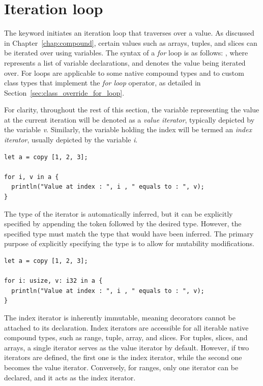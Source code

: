 \section{Iteration loop}%
\label{sec:flow:for_loop}
\label{sec:flow:for_loops}

The keyword  initiates an iteration loop that traverses over a value.
As discussed in Chapter~\ref{chap:compound}, certain values such as arrays,
tuples, and slices can be iterated over using variables. The syntax of a
\textit{for} loop is as follows: , where  represents a list of variable declarations, and  denotes the
value being iterated over. For loops are applicable to some native compound
types and to custom class types that implement the \textit{for loop} operator,
as detailed in Section~\ref{sec:class_override_for_loop}.

For clarity, throughout the rest of this section, the variable representing the
value at the current iteration will be denoted as a \textit{value iterator},
typically depicted by the variable \textit{v}. Similarly, the variable holding
the index will be termed an \textit{index iterator}, usually depicted by the
variable \textit{i}.

\begin{lstlisting}[style=coloredverbatim, escapechar=@]
let a = copy [1, 2, 3];

for i, v in a {
  println("Value at index : ", i , " equals to : ", v);
}
\end{lstlisting}

The type of the iterator is automatically inferred, but it can be explicitly
specified by appending the token \token{:} followed by the desired type.
However, the specified type must match the type that would have been inferred.
The primary purpose of explicitly specifying the type is to allow for mutability
modifications.

\begin{lstlisting}[style=coloredverbatim, escapechar=@]
let a = copy [1, 2, 3];

for i: usize, v: i32 in a {
  println("Value at index : ", i , " equals to : ", v);
}
\end{lstlisting}

The index iterator is inherently immutable, meaning decorators cannot be
attached to its declaration. Index iterators are accessible for all iterable
native compound types, such as range, tuple, array, and slices. For tuples,
slices, and arrays, a single iterator serves as the value iterator by default.
However, if two iterators are defined, the first one is the index iterator,
while the second one becomes the value iterator. Conversely, for ranges, only
one iterator can be declared, and it acts as the index iterator.


